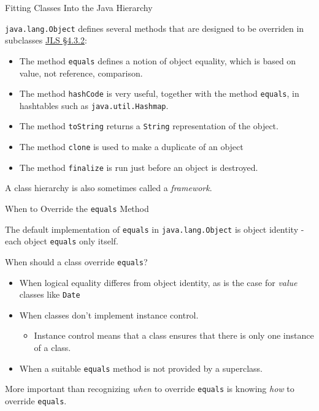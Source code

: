 \documentclass{beamer}
\author[Chris Simpkins] 
{Christopher Simpkins \\\texttt{chris.simpkins@gatech.edu}}
\institute[Georgia Tech] %
\date[CS 1331]{}
\begin{document}
\begin{frame}
  \titlepage
\end{frame}



\begin{frame}[fragile]{Fitting Classes Into the Java Hierarchy}


{\tt java.lang.Object} defines several methods that are designed to be overriden in subclasses \href{http://docs.oracle.com/javase/specs/jls/se7/html/jls-4.html#jls-4.3.2}{JLS \S 4.3.2}: 
\begin{itemize}
\item The method {\tt equals} defines a notion of object equality, which is based on value, not reference, comparison.
\item The method {\tt hashCode} is very useful, together with the method {\tt equals}, in hashtables such as {\tt java.util.Hashmap}.
\item The method {\tt toString} returns a {\tt String} representation of the object.
\item The method {\tt clone} is used to make a duplicate of an object
\item The method {\tt finalize} is run just before an object is destroyed.
\end{itemize}

A class hierarchy is also sometimes called a {\it framework}.

\end{frame}


\begin{frame}[fragile]{When to Override the {\tt equals} Method}


The default implementation of {\tt equals} in {\tt java.lang.Object} is object identity - each object {\tt equals} only itself.

When should a class override {\tt equals}?
\begin{itemize}
\item When logical equality differes from object identity, as is the case for {\it value} classes like {\tt Date}
\item When classes don't implement instance control.
  \begin{itemize}
  \item Instance control means that a class ensures that there is only one instance of a class.  
  \end{itemize}
\item When a suitable {\tt equals} method is not provided by a superclass.
\end{itemize}

More important than recognizing {\it when} to override {\tt equals} is knowing {\it how} to override {\tt equals}.
\end{frame}
\end{document}
